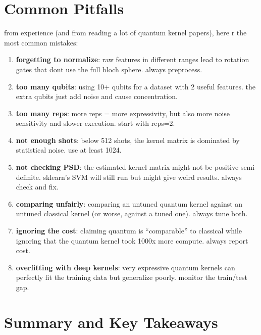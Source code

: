 \documentclass[11pt,a4paper]{article}
\theoremstyle{definition}
\theoremstyle{remark}
\begin{document}
\section{Common Pitfalls}

from experience (and from reading a lot of quantum kernel papers), here r the most common mistakes:

\begin{enumerate}[leftmargin=*]
    \item \textbf{forgetting to normalize}: raw features in different ranges lead to rotation gates that dont use the full bloch sphere. always preprocess.

    \item \textbf{too many qubits}: using 10+ qubits for a dataset with 2 useful features. the extra qubits just add noise and cause concentration.

    \item \textbf{too many reps}: more reps = more expressivity, but also more noise sensitivity and slower execution. start with reps=2.

    \item \textbf{not enough shots}: below 512 shots, the kernel matrix is dominated by statistical noise. use at least 1024.

    \item \textbf{not checking PSD}: the estimated kernel matrix might not be positive semi-definite. sklearn's SVM will still run but might give weird results. always check and fix.

    \item \textbf{comparing unfairly}: comparing an untuned quantum kernel against an untuned classical kernel (or worse, against a tuned one). always tune both.

    \item \textbf{ignoring the cost}: claiming quantum is ``comparable'' to classical while ignoring that the quantum kernel took 1000x more compute. always report cost.

    \item \textbf{overfitting with deep kernels}: very expressive quantum kernels can perfectly fit the training data but generalize poorly. monitor the train/test gap.
\end{enumerate}

\section{Summary and Key Takeaways}
\end{document}
